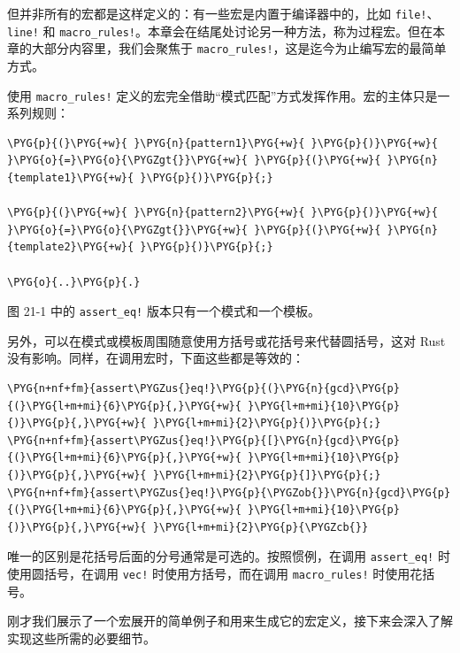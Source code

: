 但并非所有的宏都是这样定义的：有一些宏是内置于编译器中的，比如 \texttt{file!}、\texttt{line!} 和 \texttt{macro\_rules!}。本章会在结尾处讨论另一种方法，称为过程宏。但在本章的大部分内容里，我们会聚焦于 \texttt{macro\_rules!}，这是迄今为止编写宏的最简单方式。

使用 \texttt{macro\_rules!} 定义的宏完全借助“模式匹配”方式发挥作用。宏的主体只是一系列规则：

\begin{Verbatim}[commandchars=\\\{\},breaklines=true,breakanywhere=true,fontsize=\codefont,xleftmargin=17bp]
\PYG{p}{(}\PYG{+w}{ }\PYG{n}{pattern1}\PYG{+w}{ }\PYG{p}{)}\PYG{+w}{ }\PYG{o}{=}\PYG{o}{\PYGZgt{}}\PYG{+w}{ }\PYG{p}{(}\PYG{+w}{ }\PYG{n}{template1}\PYG{+w}{ }\PYG{p}{)}\PYG{p}{;}

\PYG{p}{(}\PYG{+w}{ }\PYG{n}{pattern2}\PYG{+w}{ }\PYG{p}{)}\PYG{+w}{ }\PYG{o}{=}\PYG{o}{\PYGZgt{}}\PYG{+w}{ }\PYG{p}{(}\PYG{+w}{ }\PYG{n}{template2}\PYG{+w}{ }\PYG{p}{)}\PYG{p}{;}

\PYG{o}{..}\PYG{p}{.}
\end{Verbatim}

图 21-1 中的 \texttt{assert\_eq!} 版本只有一个模式和一个模板。

另外，可以在模式或模板周围随意使用方括号或花括号来代替圆括号，这对 Rust 没有影响。同样，在调用宏时，下面这些都是等效的：

\begin{Verbatim}[commandchars=\\\{\},breaklines=true,breakanywhere=true,fontsize=\codefont,xleftmargin=17bp]
\PYG{n+nf+fm}{assert\PYGZus{}eq!}\PYG{p}{(}\PYG{n}{gcd}\PYG{p}{(}\PYG{l+m+mi}{6}\PYG{p}{,}\PYG{+w}{ }\PYG{l+m+mi}{10}\PYG{p}{)}\PYG{p}{,}\PYG{+w}{ }\PYG{l+m+mi}{2}\PYG{p}{)}\PYG{p}{;}
\PYG{n+nf+fm}{assert\PYGZus{}eq!}\PYG{p}{[}\PYG{n}{gcd}\PYG{p}{(}\PYG{l+m+mi}{6}\PYG{p}{,}\PYG{+w}{ }\PYG{l+m+mi}{10}\PYG{p}{)}\PYG{p}{,}\PYG{+w}{ }\PYG{l+m+mi}{2}\PYG{p}{]}\PYG{p}{;}
\PYG{n+nf+fm}{assert\PYGZus{}eq!}\PYG{p}{\PYGZob{}}\PYG{n}{gcd}\PYG{p}{(}\PYG{l+m+mi}{6}\PYG{p}{,}\PYG{+w}{ }\PYG{l+m+mi}{10}\PYG{p}{)}\PYG{p}{,}\PYG{+w}{ }\PYG{l+m+mi}{2}\PYG{p}{\PYGZcb{}}
\end{Verbatim}

唯一的区别是花括号后面的分号通常是可选的。按照惯例，在调用 \texttt{assert\_eq!} 时使用圆括号，在调用 \texttt{vec!} 时使用方括号，而在调用 \texttt{macro\_rules!} 时使用花括号。

刚才我们展示了一个宏展开的简单例子和用来生成它的宏定义，接下来会深入了解实现这些所需的必要细节。

